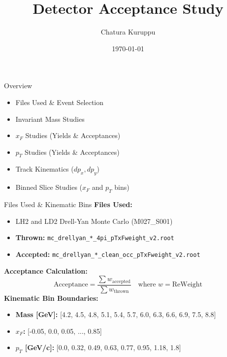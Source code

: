 \documentclass[aspectratio=169]{beamer}
\title{Detector Acceptance Study}
\author{Chatura Kuruppu}
\date{\today}
\begin{document}
\begin{frame}
    \titlepage
\end{frame}

\begin{frame}{Overview}
    \begin{itemize}
        \item Files Used \& Event Selection
        \item Invariant Mass Studies
        \item $x_F$ Studies (Yields \& Acceptances)
        \item $p_T$ Studies (Yields \& Acceptances)
        \item Track Kinematics ($dp_x, dp_y$)
        \item Binned Slice Studies ($x_F$ and $p_T$ bins)
    \end{itemize}
\end{frame}

\begin{frame}{Files Used \& Kinematic Bins}
    \textbf{Files Used:}
    \begin{itemize}
        \item LH2 and LD2 Drell-Yan Monte Carlo (M027\_S001)
        \item \textbf{Thrown:} \texttt{mc\_drellyan\_*\_4pi\_pTxFweight\_v2.root}
        \item \textbf{Accepted:} \texttt{mc\_drellyan\_*\_clean\_occ\_pTxFweight\_v2.root}
    \end{itemize}
    \vspace{0.2cm}
    \textbf{Acceptance Calculation:}
    \begin{equation*}
        \text{Acceptance} = \frac{\sum w_{\text{accepted}}}{\sum w_{\text{thrown}}} \quad \text{where } w = \text{ReWeight}
    \end{equation*}
    \vspace{0.1cm}
    \textbf{Kinematic Bin Boundaries:}
    \begin{itemize}
        \item \textbf{Mass [GeV]:} [4.2, 4.5, 4.8, 5.1, 5.4, 5.7, 6.0, 6.3, 6.6, 6.9, 7.5, 8.8]
        \item \textbf{$x_F$:} [-0.05, 0.0, 0.05, ..., 0.85]
        \item \textbf{$p_T$ [GeV/c]:} [0.0, 0.32, 0.49, 0.63, 0.77, 0.95, 1.18, 1.8]
    \end{itemize}
\end{frame}
\end{document}
